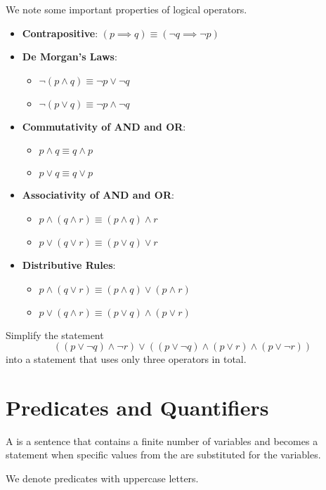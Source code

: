We note some important properties of logical operators.
\begin{itemize}
    \item \textbf{Contrapositive}: $(p \implies q) \equiv (\lnot q \implies \lnot p)$
    \item \textbf{De Morgan's Laws}: \begin{itemize}
        \item $\lnot (p \land q) \equiv \lnot p \lor \lnot q$
        \item $\lnot (p \lor q) \equiv \lnot p \land \lnot q$
    \end{itemize}
    \item \textbf{Commutativity of AND and OR}: \begin{itemize}
        \item $p \land q \equiv q \land p$
        \item $p \lor q \equiv q \lor p$
    \end{itemize}
    \item \textbf{Associativity of AND and OR}: \begin{itemize}
        \item $p \land (q \land r) \equiv (p \land q) \land r$
        \item $p \lor (q \lor r) \equiv (p \lor q) \lor r$
    \end{itemize}
    \item \textbf{Distributive Rules}: \begin{itemize}
        \item $p \land (q \lor r) \equiv (p \land q) \lor (p \land r)$
        \item $p \lor (q \land r) \equiv (p \lor q) \land (p \lor r)$
    \end{itemize}
\end{itemize}

\begin{exercise}
    Simplify the statement
    \[
        ((p \lor \lnot q) \land \lnot r) \lor ((p \lor \lnot q) \land (p \lor r) \land (p \lor \lnot r))
    \]
    into a statement that uses only three operators in total.
\end{exercise}

\section{Predicates and Quantifiers}
\begin{definition}
    A  is a sentence that contains a finite number of variables and becomes a statement when specific values from the  are substituted for the variables.
\end{definition}
\begin{remark}
    We denote predicates with uppercase letters.
\end{remark}

